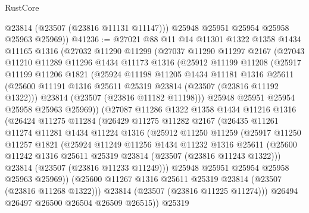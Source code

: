 \begin{lexlean}{RustCore}
\begin{coremodule}
          @23814
          (@23507 (@23816 @11131 @11147)))
        @25948
        @25951
        @25954
        @25958
        @25963
        @25969))
@41236 := @27021
    @88
    @11
    @14
    @11301
    @1322
    @1358
    @1434
    @11165
    @1316
    (@27032
      @11290
      @11299
      (@27037
        @11290
        @11297
        @2167
        (@27043
          @11210
          @11289
          @11296
          @1434
          @11173
          @1316
          (@25912
            @11199
            @11208
            (@25917
              @11199
              @11206
              @1821
              (@25924
                @11198
                @11205
                @1434
                @11181
                @1316
                @25611
                (@25600 @11191 @1316 @25611 @25319 @23814 (@23507 (@23816 @11192 @1322)))
                @23814
                (@23507 (@23816 @11182 @11198)))
              @25948
              @25951
              @25954
              @25958
              @25963
              @25969))
          (@27087
            @11286
            @1322
            @1358
            @1434
            @11216
            @1316
            (@26424
              @11275
              @11284
              (@26429
                @11275
                @11282
                @2167
                (@26435
                  @11261
                  @11274
                  @11281
                  @1434
                  @11224
                  @1316
                  (@25912
                    @11250
                    @11259
                    (@25917
                      @11250
                      @11257
                      @1821
                      (@25924
                        @11249
                        @11256
                        @1434
                        @11232
                        @1316
                        @25611
                        (@25600 @11242 @1316 @25611 @25319 @23814 (@23507 (@23816 @11243 @1322)))
                        @23814
                        (@23507 (@23816 @11233 @11249)))
                      @25948
                      @25951
                      @25954
                      @25958
                      @25963
                      @25969))
                  (@25600 @11267 @1316 @25611 @25319 @23814 (@23507 (@23816 @11268 @1322)))
                  @23814
                  (@23507 (@23816 @11225 @11274)))
                @26494
                @26497
                @26500
                @26504
                @26509
                @26515))
            @25319

\end{coremodule}
\end{lexlean}
